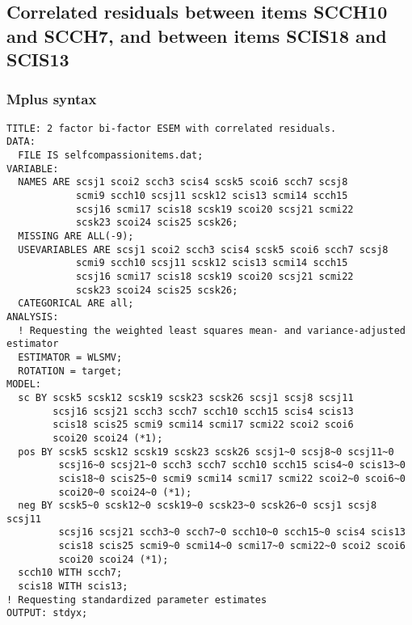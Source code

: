 \begin{appendix}


\newpage

\hypertarget{correlated-residuals-between-items-scch10-and-scch7-and-between-items-scis18-and-scis13}{%
\subsection{Correlated residuals between items SCCH10 and SCCH7, and
between items SCIS18 and
SCIS13}\label{correlated-residuals-between-items-scch10-and-scch7-and-between-items-scis18-and-scis13}}

\hypertarget{mplus-syntax-2}{%
\subsubsection{Mplus syntax}\label{mplus-syntax-2}}

\begin{verbatim}
TITLE: 2 factor bi-factor ESEM with correlated residuals.
DATA:
  FILE IS selfcompassionitems.dat;
VARIABLE:
  NAMES ARE scsj1 scoi2 scch3 scis4 scsk5 scoi6 scch7 scsj8 
            scmi9 scch10 scsj11 scsk12 scis13 scmi14 scch15 
            scsj16 scmi17 scis18 scsk19 scoi20 scsj21 scmi22 
            scsk23 scoi24 scis25 scsk26; 
  MISSING ARE ALL(-9);
  USEVARIABLES ARE scsj1 scoi2 scch3 scis4 scsk5 scoi6 scch7 scsj8 
            scmi9 scch10 scsj11 scsk12 scis13 scmi14 scch15 
            scsj16 scmi17 scis18 scsk19 scoi20 scsj21 scmi22 
            scsk23 scoi24 scis25 scsk26; 
  CATEGORICAL ARE all;
ANALYSIS:
  ! Requesting the weighted least squares mean- and variance-adjusted estimator
  ESTIMATOR = WLSMV;
  ROTATION = target;
MODEL:
  sc BY scsk5 scsk12 scsk19 scsk23 scsk26 scsj1 scsj8 scsj11 
        scsj16 scsj21 scch3 scch7 scch10 scch15 scis4 scis13 
        scis18 scis25 scmi9 scmi14 scmi17 scmi22 scoi2 scoi6 
        scoi20 scoi24 (*1);
  pos BY scsk5 scsk12 scsk19 scsk23 scsk26 scsj1~0 scsj8~0 scsj11~0 
         scsj16~0 scsj21~0 scch3 scch7 scch10 scch15 scis4~0 scis13~0 
         scis18~0 scis25~0 scmi9 scmi14 scmi17 scmi22 scoi2~0 scoi6~0 
         scoi20~0 scoi24~0 (*1);
  neg BY scsk5~0 scsk12~0 scsk19~0 scsk23~0 scsk26~0 scsj1 scsj8 scsj11 
         scsj16 scsj21 scch3~0 scch7~0 scch10~0 scch15~0 scis4 scis13 
         scis18 scis25 scmi9~0 scmi14~0 scmi17~0 scmi22~0 scoi2 scoi6 
         scoi20 scoi24 (*1);
  scch10 WITH scch7;
  scis18 WITH scis13;
! Requesting standardized parameter estimates
OUTPUT: stdyx;
\end{verbatim}


\end{appendix}
